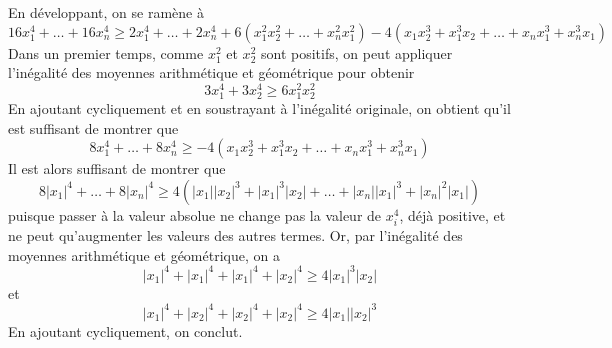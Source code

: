 En développant, on se ramène à
$$16x_1^4 + \dots + 16x_n^4 \ge 2x_1^4 + \dots + 2x_n^4 + 6(x_1^2x_2^2 + \dots + x_n^2x_1^2) - 4(x_1x_2^3 + x_1^3x_2 + \dots + x_nx_1^3 + x_n^3x_1)$$
Dans un premier temps, comme $x_1^2$ et $x_2^2$ sont positifs, on peut appliquer l'inégalité des moyennes arithmétique et géométrique pour obtenir
$$3x_1^4 + 3x_2^4 \ge 6x_1^2x_2^2$$
En ajoutant cycliquement et en soustrayant à l'inégalité originale, on obtient qu'il est suffisant de montrer que
$$8x_1^4 + \dots + 8x_n^4 \ge -4(x_1x_2^3 + x_1^3x_2 + \dots + x_nx_1^3 + x_n^3x_1)$$
Il est alors suffisant de montrer que
$$8|x_1|^4 + \dots + 8|x_n|^4 \ge 4(|x_1||x_2|^3 + |x_1|^3|x_2| + \dots + |x_n||x_1|^3 + |x_n|^2|x_1|)$$
puisque passer à la valeur absolue ne change pas la valeur de $x_i^4$, déjà positive, et ne peut qu'augmenter les valeurs des autres termes.
Or, par l'inégalité des moyennes arithmétique et géométrique, on a
$$|x_1|^4 + |x_1|^4 + |x_1|^4 + |x_2|^4 \ge 4|x_1|^3|x_2|$$
et
$$|x_1|^4 + |x_2|^4 + |x_2|^4 + |x_2|^4 \ge 4|x_1||x_2|^3$$
En ajoutant cycliquement, on conclut.
